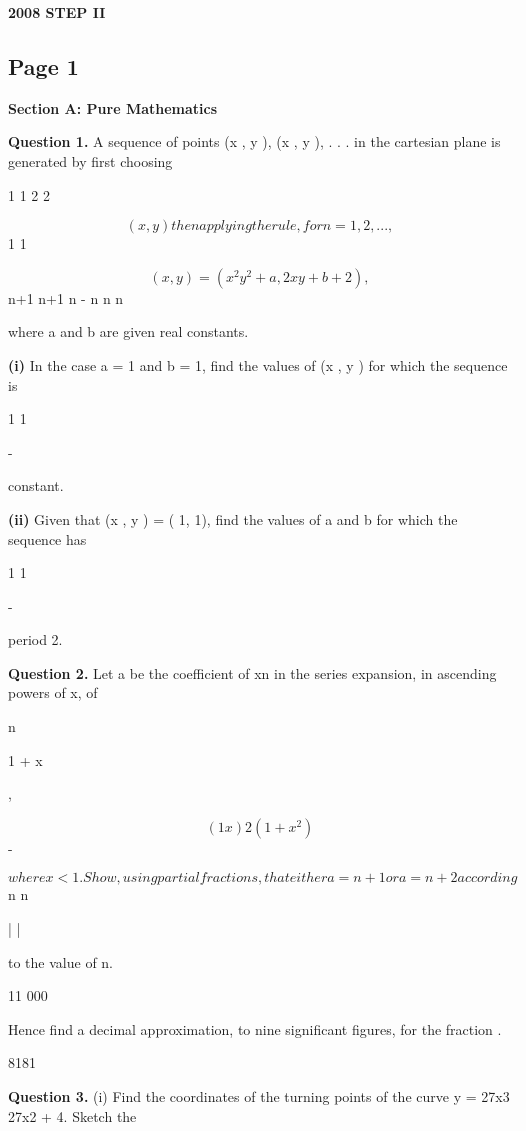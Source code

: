 \documentclass[12pt]{article}
\begin{document}
\begin{center}
{\Large \textbf{2008 STEP II}}
\end{center}

\subsection*{Page 1}
\begin{flushleft}
\bigskip\textbf{Section A: Pure Mathematics}\par
\bigskip\textbf{Question 1.} A sequence of points (x , y ), (x , y ), . . . in the cartesian plane is generated by first choosing\par
1 1 2 2\par
\[(x , y ) then applying the rule, for n = 1, 2, . . .,\]
1 1\par
\[(x , y ) = (x^2 y^2 + a, 2x y + b + 2) ,\]
n+1 n+1 n - n n n\par
where a and b are given real constants.\par
\textbf{(i)} In the case a = 1 and b = 1, find the values of (x , y ) for which the sequence is\par
1 1\par
-\par
constant.\par
\textbf{(ii)} Given that (x , y ) = ( 1, 1), find the values of a and b for which the sequence has\par
1 1\par
-\par
period 2.\par
\bigskip\textbf{Question 2.} Let a be the coefficient of xn in the series expansion, in ascending powers of x, of\par
n\par
1 + x\par
,\par
\[(1 x)2(1 + x^2)\]
-\par
\[where x < 1 . Show, using partial fractions, that either a = n + 1 or a = n + 2 according\]
n n\par
| |\par
to the value of n.\par
11 000\par
Hence find a decimal approximation, to nine significant figures, for the fraction .\par
8181\par
[You are not required to justify the accuracy of your approximation.]\par
\bigskip\textbf{Question 3.} (i) Find the coordinates of the turning points of the curve y = 27x3 27x2 + 4. Sketch the\par

\end{flushleft}
\end{document}
